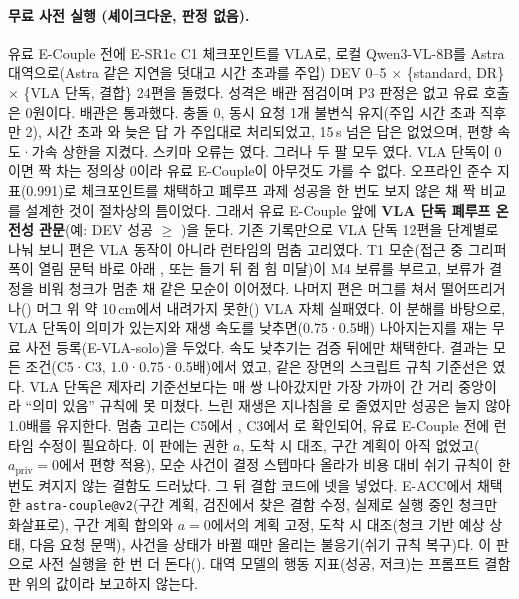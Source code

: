 \paragraph{무료 사전 실행 (셰이크다운, 판정 없음).} 유료 E-Couple 전에 E-SR1c C1 체크포인트를 VLA로, 로컬 Qwen3-VL-8B를 Astra 대역으로(Astra 같은 지연을 덧대고 시간 초과를 주입) DEV 0--5 $\times$ \{standard, DR\} $\times$ \{VLA 단독, 결합\} 24편을 돌렸다. 성격은 배관 점검이며 P3 판정은 없고 유료 호출은 0원이다. 배관은 통과했다. 충돌 0, 동시 요청 1개 불변식 유지(주입 시간 초과 직후만 2), 시간 초과 와 늦은 답 가 주입대로 처리되었고, 15\,s 넘은 답은 없었으며, 편향 속도·가속 상한을 지켰다. 스키마 오류는 였다. 그러나 두 팔 모두 였다. VLA 단독이 0이면 짝 차는 정의상 0이라 유료 E-Couple이 아무것도 가를 수 없다. 오프라인 준수 지표(0.991)로 체크포인트를 채택하고 폐루프 과제 성공을 한 번도 보지 않은 채 짝 비교를 설계한 것이 절차상의 틈이었다. 그래서 유료 E-Couple 앞에 \textbf{VLA 단독 폐루프 온전성 관문}(예: DEV 성공 $\ge$ )을 둔다. 기존 기록만으로 VLA 단독 12편을 단계별로 나눠 보니 편은 VLA 동작이 아니라 런타임의 멈춤 고리였다. T1 모순(접근 중 그리퍼 폭이 열림 문턱 바로 아래 , 또는 들기 뒤 쥠 힘 미달)이 M4 보류를 부르고, 보류가 결정을 비워 청크가 멈춘 채 같은 모순이 이어졌다. 나머지 편은 머그를 쳐서 떨어뜨리거나() 머그 위 약 10\,cm에서 내려가지 못한() VLA 자체 실패였다. 이 분해를 바탕으로, VLA 단독이 의미가 있는지와 재생 속도를 낮추면(0.75·0.5배) 나아지는지를 재는 무료 사전 등록(E-VLA-solo)을 두었다. 속도 낮추기는 검증 뒤에만 채택한다. 결과는 모든 조건(C5·C3, 1.0·0.75·0.5배)에서 였고, 같은 장면의 스크립트 규칙 기준선은 였다. VLA 단독은 제자리 기준선보다는 매 쌍 나아갔지만 가장 가까이 간 거리 중앙이 라 ``의미 있음'' 규칙에 못 미쳤다. 느린 재생은 지나침을 로 줄였지만 성공은 늘지 않아 1.0배를 유지한다. 멈춤 고리는 C5에서 , C3에서 로 확인되어, 유료 E-Couple 전에 런타임 수정이 필요하다. 이 판에는 권한 $a$, 도착 시 대조, 구간 계획이 아직 없었고($a_{\text{priv}}{=}0$에서 편향  적용), 모순 사건이 결정 스텝마다 올라가 비용 대비 쉬기 규칙이 한 번도 켜지지 않는 결함도 드러났다. 그 뒤 결합 코드에 넷을 넣었다. E-ACC에서 채택한 \texttt{astra-couple@v2}(구간 계획, 검진에서 찾은 결함 수정, 실제로 실행 중인 청크만 화살표로), 구간 계획 합의와 $a{=}0$에서의 계획 고정, 도착 시 대조(청크 기반 예상 상태, 다음 요청 문맥), 사건을 상태가 바뀔 때만 올리는 불응기(쉬기 규칙 복구)다. 이 판으로 사전 실행을 한 번 더 돈다(). 대역 모델의 행동 지표(성공, 저크)는 프롬프트 결함 판 위의 값이라 보고하지 않는다.

